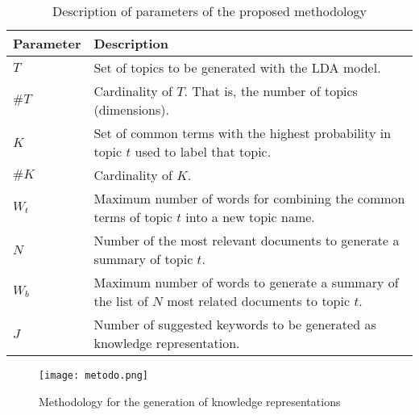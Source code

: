 \documentclass[runningheads]{llncs}
\begin{document}
\begin{table*}[!h]
	\caption{\centering Description of parameters of the proposed methodology}
	\begin{center}
		\begin{tabular}{|l|l|}
			\hline
			\textbf{Parameter} & \textbf{Description}                                                            \\ \hline
			$T$                  & Set of topics to be generated with the LDA model. \\ \hline
			$\#T$                & Cardinality of $T$. That is, the number of topics (dimensions).                                    \\ \hline
			$K$                  & Set of common terms with the highest probability in topic $t$ used to label that topic. \\ \hline
			$\#K$ 				 & Cardinality of $K$.                                         \\ \hline
			$W_{t}$   			 & Maximum number of words for combining the common terms of topic $t$ into a new topic name.\\ \hline
			$N$                  & Number of the most relevant documents to generate a summary of topic $t$.\\ \hline
			$W_b$                & Maximum number of words to generate a summary of the list of $N$ most related documents to topic $t$.\\ \hline
			$J$                  & Number of suggested keywords to be generated as knowledge representation.\\ \hline
		\end{tabular}
		\label{tabDescription}
	\end{center}
\end{table*}

\begin{figure*}[!h]
	\centering
	\texttt{[image: metodo.png]}
	\caption{Methodology for the generation of knowledge representations}
	\label{fig:Methodology}
\end{figure*}
\end{document}
